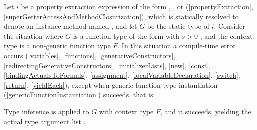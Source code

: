 \documentclass[makeidx]{article}
\begin{document}
{\LMHash{}%
Let $i$ be a property extraction expression of the form
, , or 
(\ref{propertyExtraction}, \ref{superGetterAccessAndMethodClosurization}),
which is statically resolved to denote an instance method named \id,
and let $G$ be the static type of $i$.
Consider the situation where $G$ is a function type of the form
with $s > 0$
,
and the context type is a non-generic function type $F$.
In this situation a compile-time error occurs
(\ref{variables},
\ref{functions},
\ref{generativeConstructors},
\ref{redirectingGenerativeConstructors},
\ref{initializerLists},
\ref{new},
\ref{const},
\ref{bindingActualsToFormals},
\ref{assignment},
\ref{localVariableDeclaration},
\ref{switch},
\ref{return},
\ref{yieldEach}),
except when generic function type instantiation
(\ref{genericFunctionInstantiation})
succeeds, that is:

\LMHash{}%
Type inference is applied to $G$ with context type $F$,
and it succeeds, yielding the actual type argument list
.

{ %

\def\gmiName{\metavar{gmiName\ensuremath{_{\id}}}}

}}
\end{document}
